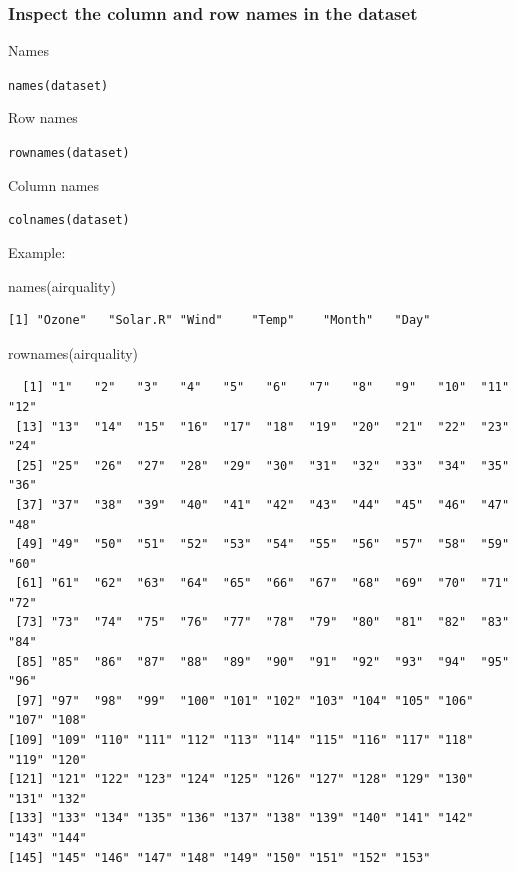 \documentclass[
  letterpaper,
  DIV=11,
  numbers=noendperiod]{scrreprt}
\newenvironment{Shaded}{\begin{snugshade}}{\end{snugshade}}
\newcommand{\FunctionTok}[1]{\textcolor[rgb]{0.28,0.35,0.67}{#1}}
\newcommand{\NormalTok}[1]{\textcolor[rgb]{0.00,0.23,0.31}{#1}}
\begin{document}
\subsubsection{Inspect the column and row names in the
dataset}\label{inspect-the-column-and-row-names-in-the-dataset}

Names

\texttt{names(dataset)}

Row names

\texttt{rownames(dataset)}

Column names

\texttt{colnames(dataset)}

Example:

\begin{Shaded}
\begin{Highlighting}[]
\FunctionTok{names}\NormalTok{(airquality)}
\end{Highlighting}
\end{Shaded}

\begin{verbatim}
[1] "Ozone"   "Solar.R" "Wind"    "Temp"    "Month"   "Day"    
\end{verbatim}

\begin{Shaded}
\begin{Highlighting}[]
\FunctionTok{rownames}\NormalTok{(airquality)}
\end{Highlighting}
\end{Shaded}

\begin{verbatim}
  [1] "1"   "2"   "3"   "4"   "5"   "6"   "7"   "8"   "9"   "10"  "11"  "12" 
 [13] "13"  "14"  "15"  "16"  "17"  "18"  "19"  "20"  "21"  "22"  "23"  "24" 
 [25] "25"  "26"  "27"  "28"  "29"  "30"  "31"  "32"  "33"  "34"  "35"  "36" 
 [37] "37"  "38"  "39"  "40"  "41"  "42"  "43"  "44"  "45"  "46"  "47"  "48" 
 [49] "49"  "50"  "51"  "52"  "53"  "54"  "55"  "56"  "57"  "58"  "59"  "60" 
 [61] "61"  "62"  "63"  "64"  "65"  "66"  "67"  "68"  "69"  "70"  "71"  "72" 
 [73] "73"  "74"  "75"  "76"  "77"  "78"  "79"  "80"  "81"  "82"  "83"  "84" 
 [85] "85"  "86"  "87"  "88"  "89"  "90"  "91"  "92"  "93"  "94"  "95"  "96" 
 [97] "97"  "98"  "99"  "100" "101" "102" "103" "104" "105" "106" "107" "108"
[109] "109" "110" "111" "112" "113" "114" "115" "116" "117" "118" "119" "120"
[121] "121" "122" "123" "124" "125" "126" "127" "128" "129" "130" "131" "132"
[133] "133" "134" "135" "136" "137" "138" "139" "140" "141" "142" "143" "144"
[145] "145" "146" "147" "148" "149" "150" "151" "152" "153"
\end{verbatim}
\end{document}
